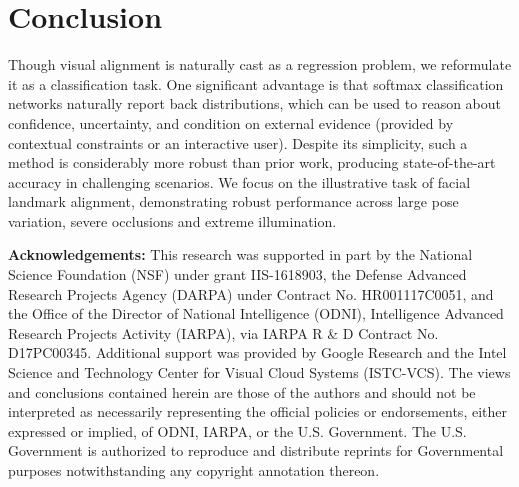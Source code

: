 \documentclass[letterpaper]{article} %
\begin{document}
\section{Conclusion}
\setcounter{secnumdepth}{2}
Though visual alignment is naturally cast as a regression problem, we reformulate it as a classification task. One significant advantage is that softmax classification networks naturally report back distributions, which can be used to reason about confidence, uncertainty, and condition on external evidence (provided by contextual constraints or an interactive user). Despite its simplicity, such a method is considerably more robust than prior work, producing state-of-the-art accuracy in challenging scenarios. We focus on the illustrative task of facial landmark alignment, demonstrating robust performance across large pose variation, severe occlusions and extreme illumination.


{\bf Acknowledgements:}
This research was supported in part by the National Science Foundation (NSF) under grant IIS-1618903, the Defense Advanced Research Projects Agency (DARPA) under Contract No. HR001117C0051, and the Office of the Director of National Intelligence (ODNI), Intelligence Advanced Research Projects Activity (IARPA), via IARPA R \& D Contract No. D17PC00345. Additional support was provided by Google Research and the Intel Science and Technology Center for Visual Cloud Systems (ISTC-VCS). The views and conclusions contained herein are those of the authors and should not be interpreted as necessarily representing the official policies or endorsements, either expressed or implied, of ODNI, IARPA, or the U.S. Government. The U.S. Government is authorized to reproduce and distribute reprints for Governmental purposes notwithstanding any copyright annotation thereon.
\end{document}
